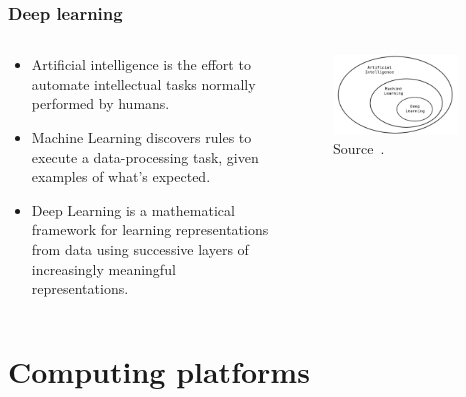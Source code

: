 \documentclass[aspectratio=169]{beamer}
\begin{document}
\begin{frame}
    \frametitle{Deep learning}
    \begin{columns}
        \begin{column}{0.5\textwidth}
            \begin{itemize}
                \item Artificial intelligence is the effort to automate 
                    intellectual tasks normally performed by humans.
                \item Machine Learning discovers rules to execute a 
                    data-processing task, given examples of what's expected.
                \item Deep Learning is a mathematical framework for learning
                    representations from data using successive layers of 
                    increasingly meaningful representations.
            \end{itemize}
        \end{column}
        \begin{column}{0.5\textwidth}
            \begin{figure}
                \centering
                \includegraphics[width=0.9\textwidth]{img/ai_onion.png}
                \caption{Source~\cite{chollet2018}.}
            \end{figure}
        \end{column}
    \end{columns}
\end{frame}





\section{Computing platforms}
\end{document}
